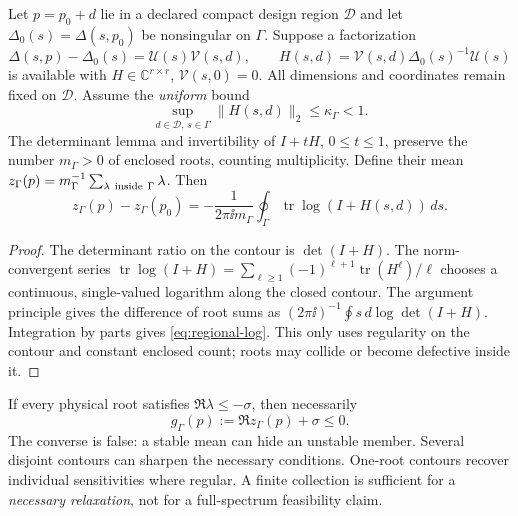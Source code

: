 Let $p=p_0+d$ lie in a declared compact design region $\mathcal D$ and
let $\Delta_0(s)=\Delta(s,p_0)$ be nonsingular on $\Gamma$.
Suppose a factorization
\[
 \Delta(s,p)-\Delta_0(s)=\mathcal U(s)\mathcal V(s,d),\qquad
 H(s,d)=\mathcal V(s,d)\Delta_0(s)^{-1}\mathcal U(s)
\]
is available with $H\in\mathbb C^{r\times r}$, $\mathcal V(s,0)=0$.
All dimensions and coordinates remain fixed on $\mathcal D$.
Assume the \emph{uniform} bound
\begin{equation}
 \sup_{d\in\mathcal D,\,s\in\Gamma}\|H(s,d)\|_2
 \le\kappa_\Gamma<1 . \label{eq:regional-kappa}
\end{equation}
The determinant lemma and invertibility of $I+tH$, $0\le t\le1$,
preserve the number $m_\Gamma>0$ of enclosed roots, counting multiplicity.
Define their mean $z_\Gamma(p)=m_\Gamma^{-1}
\sum_{\lambda\ {\rm inside}\ \Gamma}\lambda$.
Then
\begin{equation}
 \boxed{z_\Gamma(p)-z_\Gamma(p_0)
 =-\frac{1}{2\pi\ii m_\Gamma}
       \oint_\Gamma \operatorname{tr}\log(I+H(s,d))\,ds .}
 \label{eq:regional-log}
\end{equation}
\begin{proof}
The determinant ratio on the contour is $\det(I+H)$.
The norm-convergent series
$\operatorname{tr}\log(I+H)=
\sum_{\ell\ge1}(-1)^{\ell+1}\operatorname{tr}(H^\ell)/\ell$
chooses a continuous, single-valued logarithm along the closed contour.
The argument principle gives the difference of root sums as
$(2\pi\ii)^{-1}\oint s\,d\log\det(I+H)$.
Integration by parts gives \eqref{eq:regional-log}.
This only uses regularity on the contour and constant enclosed count;
roots may collide or become defective inside it.
\end{proof}

If every physical root satisfies $\Re\lambda\le-\sigma$, then necessarily
\[
 g_\Gamma(p):=\Re z_\Gamma(p)+\sigma\le0.
\]
The converse is false: a stable mean can hide an unstable member.
Several disjoint contours can sharpen the necessary conditions.
One-root contours recover individual sensitivities where regular.
A finite collection is sufficient for a \emph{necessary relaxation},
not for a full-spectrum feasibility claim.

